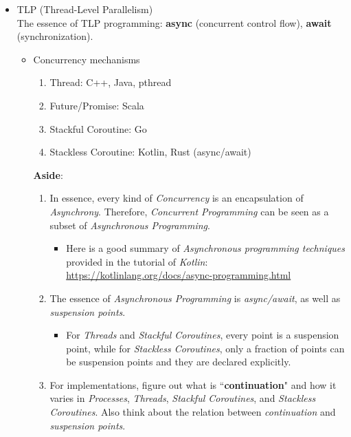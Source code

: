 \documentclass{article}
\begin{document}
\begin{itemize}
    \item TLP (Thread-Level Parallelism)\\
    The essence of TLP programming: \textbf{async} (concurrent control flow), \textbf{await} (synchronization).
    \begin{itemize}
        \item Concurrency mechanisms
        \begin{enumerate}
            \item Thread: C++, Java, pthread
            \item Future/Promise: Scala
            \item Stackful Coroutine: Go
            \item Stackless Coroutine: Kotlin, Rust (async/await)
        \end{enumerate}
        \textbf{Aside}:
        \begin{enumerate}
            \item In essence, every kind of \emph{Concurrency} is an encapsulation of \emph{Asynchrony}.
        Therefore, \emph{Concurrent Programming} can be seen as a subset of \emph{Asynchronous Programming}.
            \begin{itemize}
                \item Here is a good summary of \emph{Asynchronous programming techniques} provided in the tutorial of \emph{Kotlin}:
            \href{https://kotlinlang.org/docs/async-programming.html}{https://kotlinlang.org/docs/async-programming.html}
            \end{itemize}
            \item The essence of \emph{Asynchronous Programming} is \emph{async/await}, as well as \emph{suspension points}.
            \begin{itemize}
                \item For \emph{Threads} and \emph{Stackful Coroutines}, every point is a suspension point, while for \emph{Stackless Coroutines}, only a fraction of points can be suspension points and they are declared explicitly.
            \end{itemize}
            \item For implementations, figure out what is ``\textbf{continuation}" and how it varies in \emph{Processes}, \emph{Threads}, \emph{Stackful Coroutines}, and \emph{Stackless Coroutines}.
            Also think about the relation between \emph{continuation} and \emph{suspension points}.
        \end{enumerate}


\end{itemize}
\end{itemize}
\end{document}
